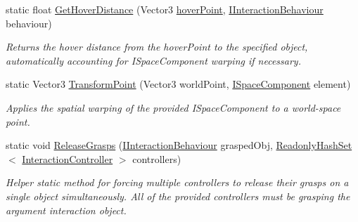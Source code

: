 \begin{DoxyCompactItemize}
\item 
static float \mbox{\hyperlink{class_leap_1_1_unity_1_1_interaction_1_1_interaction_controller_a78d837eccab12304e8c02b79fda189d1}{Get\+Hover\+Distance}} (Vector3 \mbox{\hyperlink{class_leap_1_1_unity_1_1_interaction_1_1_interaction_controller_a7c2b239ce82be01d82b7d8305dbfe0e5}{hover\+Point}}, \mbox{\hyperlink{interface_leap_1_1_unity_1_1_interaction_1_1_i_interaction_behaviour}{I\+Interaction\+Behaviour}} behaviour)
\begin{DoxyCompactList}\small\item\em Returns the hover distance from the hover\+Point to the specified object, automatically accounting for I\+Space\+Component warping if necessary. \end{DoxyCompactList}\item 
static Vector3 \mbox{\hyperlink{class_leap_1_1_unity_1_1_interaction_1_1_interaction_controller_a8a3b2a0cac8dd47e4a447c5d188b8ca8}{Transform\+Point}} (Vector3 world\+Point, \mbox{\hyperlink{interface_leap_1_1_unity_1_1_space_1_1_i_space_component}{I\+Space\+Component}} element)
\begin{DoxyCompactList}\small\item\em Applies the spatial warping of the provided I\+Space\+Component to a world-\/space point. \end{DoxyCompactList}\item 
static void \mbox{\hyperlink{class_leap_1_1_unity_1_1_interaction_1_1_interaction_controller_abbf648deb30c375dc846e7af2166dd26}{Release\+Grasps}} (\mbox{\hyperlink{interface_leap_1_1_unity_1_1_interaction_1_1_i_interaction_behaviour}{I\+Interaction\+Behaviour}} grasped\+Obj, \mbox{\hyperlink{struct_leap_1_1_unity_1_1_readonly_hash_set}{Readonly\+Hash\+Set}}$<$ \mbox{\hyperlink{class_leap_1_1_unity_1_1_interaction_1_1_interaction_controller}{Interaction\+Controller}} $>$ controllers)
\begin{DoxyCompactList}\small\item\em Helper static method for forcing multiple controllers to release their grasps on a single object simultaneously. All of the provided controllers must be grasping the argument interaction object. \end{DoxyCompactList}\end{DoxyCompactItemize}
